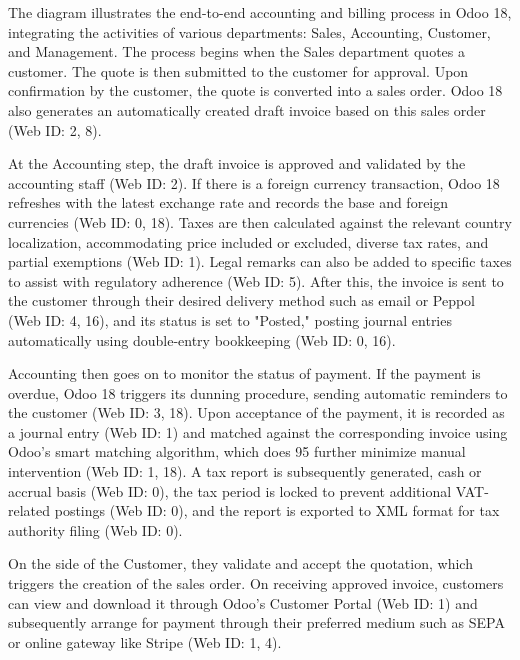 \documentclass[11pt,a4paper]{article}
\begin{document}
\hfill
\begin{minipage}{0.5\textwidth}
    The diagram illustrates the end-to-end accounting and billing process in Odoo 18, integrating the activities of various departments: Sales, Accounting, Customer, and Management. The process begins when the Sales department quotes a customer. The quote is then submitted to the customer for approval. Upon confirmation by the customer, the quote is converted into a sales order. Odoo 18 also generates an automatically created draft invoice based on this sales order (Web ID: 2, 8).
    \medskip

    At the Accounting step, the draft invoice is approved and validated by the accounting staff (Web ID: 2). If there is a foreign currency transaction, Odoo 18 refreshes with the latest exchange rate and records the base and foreign currencies (Web ID: 0, 18). Taxes are then calculated against the relevant country localization, accommodating price included or excluded, diverse tax rates, and partial exemptions (Web ID: 1). Legal remarks can also be added to specific taxes to assist with regulatory adherence (Web ID: 5). After this, the invoice is sent to the customer through their desired delivery method such as email or Peppol (Web ID: 4, 16), and its status is set to "Posted," posting journal entries automatically using double-entry bookkeeping (Web ID: 0, 16).
    \medskip

    Accounting then goes on to monitor the status of payment. If the payment is overdue, Odoo 18 triggers its dunning procedure, sending automatic reminders to the customer (Web ID: 3, 18). Upon acceptance of the payment, it is recorded as a journal entry (Web ID: 1) and matched against the corresponding invoice using Odoo's smart matching algorithm, which does 95%
    further minimize manual intervention (Web ID: 1, 18). A tax report is subsequently generated, 
    cash or accrual basis (Web ID: 0), the tax period is locked to prevent additional VAT-related 
    postings (Web ID: 0), and the report is exported to XML format for tax authority filing (Web ID: 
    0).
    \medskip
\end{minipage}
On the side of the Customer, they validate and accept the quotation, which triggers the creation 
of the sales order. On receiving approved invoice, customers can view and download it through 
Odoo's Customer Portal (Web ID: 1) and subsequently arrange for payment through their 
preferred medium such as SEPA or online gateway like Stripe (Web ID: 1, 4).
\medskip
\end{document}
